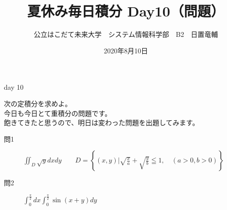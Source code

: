 \documentclass[dvipdfmx,uplatex]{jsarticle}
\title{夏休み毎日積分 Day10（問題）}
\author{公立はこだて未来大学　システム情報科学部　B2　日置竜輔}
\date{2020年8月10日}
\begin{document}
\maketitle

\begin{itembox}[c]{day 10}
    \begin{center}
        次の定積分を求めよ。\\
        今日も今日とて重積分の問題です。\\
        飽きてきたと思うので、明日は変わった問題を出題してみます。
    \end{center}
\end{itembox}

\begin{description}
    \item [問1] $ \displaystyle \iint_D \sqrt{y}dxdy \qquad
    D = \left\{(x,y) | \sqrt{\frac{x}{a}} + \sqrt{\frac{y}{b}} \leqq 1, \quad (a > 0, b > 0) \right\}$
\end{description}

\begin{description}
    \item [問2] $\displaystyle \int_0^{\frac{\pi}{2}} dx \int_0^{\frac{\pi}{2}} \sin(x + y)dy $
\end{description}
\end{document}
